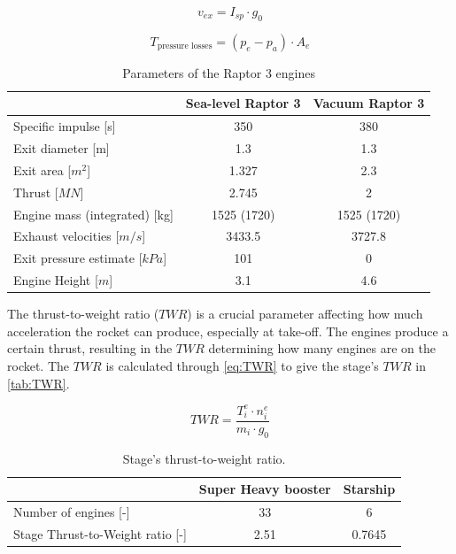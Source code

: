 \begin{equation}
    v_{ex} = I_{sp} \cdot g_0
\label{eq:exhaust_velocities}
\end{equation}

\begin{equation}
    T_{\text{pressure losses}} = (p_e - p_a) \cdot A_e
\label{eq:pressure_losses}
\end{equation}

\begin{table}[h!]
    \centering
    \caption{Parameters of the Raptor 3 engines}
    \label{tab:raptor3}
    \begin{tabular}{@{}lcc@{}}
        \toprule
        & \textbf{Sea-level Raptor 3 } & \textbf{Vacuum Raptor 3} \\ \midrule
        Specific impulse [s] & 350 & 380 \\
        Exit diameter [m] & 1.3 & 1.3 \\
        Exit area [$m^2$] & 1.327 & 2.3 \\
        Thrust [$MN$] & 2.745 & 2 \\
        Engine mass (integrated) [kg] & 1525 (1720) & 1525 (1720) \\
        Exhaust velocities [$m/s$] & 3433.5 & 3727.8 \\
        Exit pressure estimate [$kPa$] & 101 & 0 \\
        Engine Height [$m$] & 3.1 & 4.6 \\
        \bottomrule
    \end{tabular}
\end{table}


The thrust-to-weight ratio ($TWR$) is a crucial parameter affecting how much acceleration the rocket can produce, especially at take-off. The engines produce a certain thrust, resulting in the $TWR$ determining how many engines are on the rocket. The $TWR$ is calculated through \autoref{eq:TWR} to give the stage's $TWR$ in \autoref{tab:TWR}.

\begin{equation}
    TWR = \frac{T^e_i \cdot n^e_i}{m_i \cdot g_0}
\label{eq:TWR}
\end{equation}

\begin{table}[h!]
    \centering
    \caption{Stage's thrust-to-weight ratio.}
    \label{tab:TWR}
    \begin{tabular}{@{}lcc@{}}
        \toprule
        & \textbf{Super Heavy booster} & \textbf{Starship} \\ \midrule
        Number of engines [-] & 33 & 6 \\
        Stage Thrust-to-Weight ratio [-] & 2.51 & 0.7645 \\
        \bottomrule
    \end{tabular}
\end{table}

